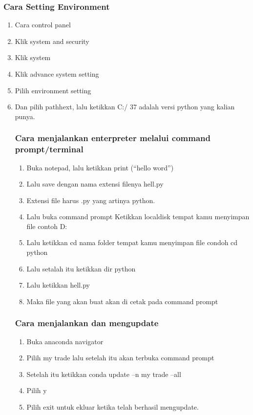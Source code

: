 \documentclass{article}
\begin{document}
\subsubsection{Cara Setting Environment}
\begin{enumerate}
\item	Cara control panel
\item	Klik system and security
\item	Klik system
\item	Klik advance system setting
\item	Pilih environment setting
\item	Dan pilih pathhext, lalu ketikkan C:/
37 adalah versi python yang kalian punya.

\subsubsection{Cara menjalankan enterpreter melalui command prompt/terminal}
\begin{enumerate}
    \item Buka notepad, lalu ketikkan print (“hello word”)
\item	Lalu save dengan nama extensi filenya hell.py
\item Extensi file harus .py yang artinya python.
\item	Lalu buka command prompt
Ketikkan localdisk tempat kamu menyimpan file contoh D:
\item	Lalu ketikkan cd nama folder tempat kamu menyimpan file condoh cd python
\item	Lalu setalah itu ketikkan dir python
\item	Lalu ketikkan hell.py
\item	Maka file yang akan buat akan di cetak pada command prompt
\end{enumerate}
\subsubsection{Cara menjalankan dan mengupdate}
\begin{enumerate}
\item	Buka anaconda navigator
\item Pilih my trade lalu setelah itu akan terbuka command prompt
\item	Setelah itu ketikkan conda update –n my trade –all
\item	Pilih y
\item Pilih exit untuk ekluar ketika telah berhasil mengupdate.
\end{enumerate}

\end{enumerate}
\end{document}
